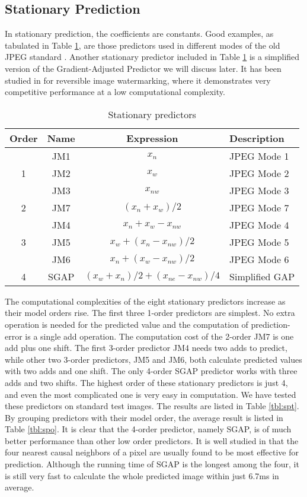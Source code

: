 \documentclass[journal]{IEEEtran}
\begin{document}
\subsection{Stationary Prediction}\label{sub:stationary}

In stationary prediction, the coefficients are constants. Good examples, as tabulated in Table
\ref{tbl:sp}, are those predictors used in different modes of the old JPEG standard
\cite{Jpeg93old}. Another stationary predictor included in Table \ref{tbl:sp} is a simplified
version of the Gradient-Adjusted Predictor we will discuss later. It has been studied in
\cite{Chen09add} for reversible image watermarking, where it demonstrates very competitive
performance at a low computational complexity. 

\begin{table}[t]
	\caption{\label{tbl:sp}Stationary predictors}
	\begin{tabular}{c|c|c|l}\hline\hline
		Order & Name & Expression & Description \\[0.5ex]\hline
		  & JM1 & $x_n$ 	& JPEG Mode 1 \\
		1 & JM2 & $x_w$ 	& JPEG Mode 2 \\
		& JM3 & $x_{nw}$ 	& JPEG Mode 3 \\\hline
		2 & JM7 & $(x_n + x_w)/2$ 		& JPEG Mode 7 \\\hline
		& JM4 & $x_n + x_w - x_{nw}$ 	& JPEG Mode 4 \\
		3 & JM5 & $x_w + (x_n - x_{nw})/2$ 	& JPEG Mode 5 \\
		& JM6 & $x_n + (x_w - x_{nw})/2$ 	& JPEG Mode 6 \\\hline
		4 & SGAP& $(x_w + x_n)/2 + (x_{ne} - x_{nw})/4$ & Simplified GAP \\\hline\hline
	\end{tabular}
\end{table}

The computational complexities of the eight stationary predictors increase as their model orders
rise. The first three 1-order predictors are simplest. No extra operation is needed for the
predicted value and the computation of prediction-error is a single add operation. The computation
cost of the 2-order JM7 is one add plus one shift. The first 3-order predictor JM4 needs two adds to
predict, while other two 3-order predictors, JM5 and JM6, both calculate predicted values with two
adds and one shift. The only 4-order SGAP predictor works with three adds and two shifts. The
highest order of these stationary predictors is just 4, and even the most complicated one is very
easy in computation. We have tested these predictors on standard test images. The results are listed
in Table \ref{tbl:spt}. By grouping predictors with their model order, the average result is listed
in Table \ref{tbl:spo}. It is clear that the 4-order predictor, namely SGAP, is of much better
performance than other low order predictors. It is well studied in \cite{ic81review} that the four
nearest causal neighbors of a pixel are usually found to be most effective for prediction. Although
the running time of SGAP is the longest among the four, it is still very fast to calculate the whole
predicted image within just 6.7ms in average. 
\end{document}
